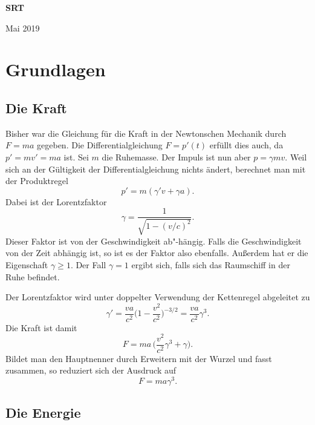 \documentclass[a4paper,11pt,fleqn,twocolumn,twoside,dvipdfmx]{scrartcl}
\begin{document}
\begin{huge}
\noindent\normalfont\bfseries\sffamily
SRT
\par
\end{huge}

\vspace{1em}\noindent
Mai 2019

\tableofcontents

\section{Grundlagen}

\subsection{Die Kraft}

Bisher war die Gleichung für die Kraft in der Newtonschen Mechanik
durch $F=ma$ gegeben. Die Differentialgleichung $F=p'(t)$ erfüllt dies
auch, da $p'=mv'=ma$ ist. Sei $m$ die Ruhemasse.
Der Impuls ist nun aber $p=\gamma mv$. Weil sich an der Gültigkeit
der Differentialgleichung nichts ändert, berechnet man mit der
Produktregel%
\[p' = m(\gamma 'v + \gamma a).\]
Dabei ist der Lorentzfaktor
\[\gamma = \frac{1}{\sqrt{1-(v/c)^2}}.\]
Dieser Faktor ist von der Geschwindigkeit ab"-hängig.
Falls die Geschwindigkeit von der Zeit abhängig ist, so ist es der
Faktor also ebenfalls. Außerdem hat er die Eigenschaft $\gamma\ge 1$.
Der Fall $\gamma=1$ ergibt sich, falls sich das Raumschiff in der
Ruhe befindet.

Der Lorentzfaktor wird unter doppelter Verwendung der Kettenregel
abgeleitet zu%
\[\gamma' = \frac{va}{c^2}\Big(1-\frac{v^2}{c^2}\Big)^{-3/2}
= \frac{va}{c^2} \gamma^3.\]
Die Kraft ist damit
\[F = ma\,\Big(\frac{v^2}{c^2}\gamma^3 + \gamma\Big).\]
Bildet man den Hauptnenner durch Erweitern mit der Wurzel und fasst
zusammen, so reduziert sich der Ausdruck auf%
\[F = ma\gamma^3.\]

\subsection{Die Energie}
\end{document}
